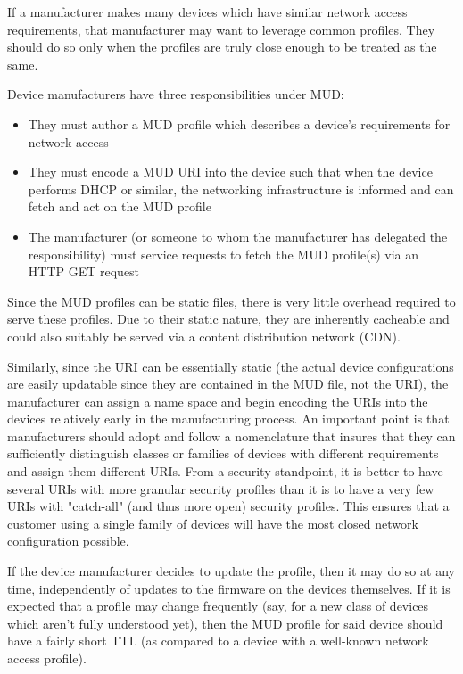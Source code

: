 \documentclass[conference]{IEEEtran}
\begin{document}
If a manufacturer makes many devices which have similar network access
requirements, that manufacturer may want to leverage common profiles.
They should do so only when the profiles are truly close enough to be
treated as the same.

Device manufacturers have three responsibilities under MUD:
\begin{itemize}
\item They must author a MUD profile which describes a device's
  requirements for network access
\item They must encode a MUD URI into the device such that when the
  device performs DHCP or similar, the networking infrastructure is
  informed and can fetch and act on the MUD profile
\item The manufacturer (or someone to whom the manufacturer has
  delegated the responsibility) must service requests to fetch the MUD
  profile(s) via an HTTP GET request
\end{itemize}
Since the MUD profiles can be static files, there is very little
overhead required to serve these profiles.  Due to their static
nature, they are inherently cacheable and could also suitably be
served via a content distribution network (CDN).

Similarly, since the URI can be essentially static (the actual device
configurations are easily updatable since they are contained in the
MUD file, not the URI), the manufacturer can assign a name space and
begin encoding the URIs into the devices relatively early in the
manufacturing process.  An important point is that manufacturers
should adopt and follow a nomenclature that insures that they can
sufficiently distinguish classes or families of devices with different
requirements and assign them different URIs.  From a security
standpoint, it is better to have several URIs with more granular
security profiles than it is to have a very few URIs with "catch-all"
(and thus more open) security profiles.  This ensures that a customer
using a single family of devices will have the most closed network
configuration possible.

If the device manufacturer decides to update the profile, then it may
do so at any time, independently of updates to the firmware on the
devices themselves.  If it is expected that a profile may change
frequently (say, for a new class of devices which aren't fully
understood yet), then the MUD profile for said device should have a
fairly short TTL (as compared to a device with a well-known network
access profile).
\end{document}
